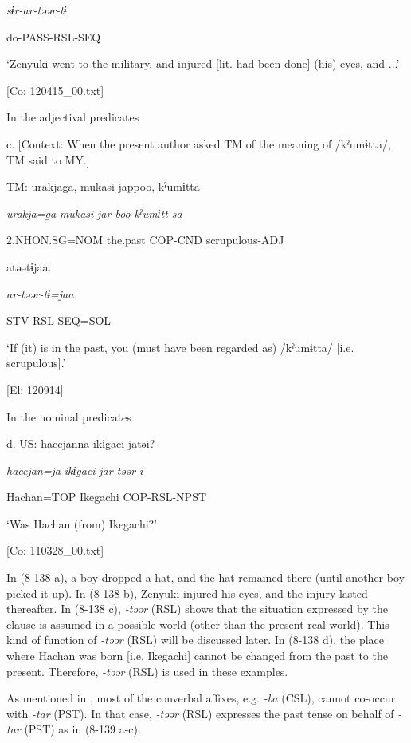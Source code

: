       \textit{sɨr-ar-təər{}-tɨ}       

      do-PASS-RSL-SEQ        

      ‘Zenyuki went to the military, and injured [lit. had been done] (his) eyes, and ...’

      [Co: 120415\_00.txt]

  In the adjectival predicates

  c.  [Context: When the present author asked TM of the meaning of /kˀumɨtta/, TM said to MY.]

    TM:  urakjaga,  mukasi  jappoo,  kˀumɨtta

      \textit{urakja=ga}  \textit{mukasi}  \textit{jar-boo}  \textit{kˀumɨtt-sa}

      2.NHON.SG=NOM  the.past  COP-CND  scrupulous-ADJ

      atəətɨjaa.

      \textit{ar-təər-tɨ=jaa}

      STV-RSL-SEQ=SOL

      ‘If (it) is in the past, you (must have been regarded as) /kˀumɨtta/ [i.e. scrupulous].’

      [El: 120914]

  In the nominal predicates

  d.  US:  haccjanna  ikɨgaci  jatəi?

      \textit{haccjan=ja}  \textit{ikɨgaci}  \textit{jar-təər{}-i}

      Hachan=TOP  Ikegachi  COP-RSL-NPST

      ‘Was Hachan (from) Ikegachi?’

      [Co: 110328\_00.txt]

In (8-138 a), a boy dropped a hat, and the hat remained there (until another boy picked it up). In (8-138 b), Zenyuki injured his eyes, and the injury lasted thereafter. In (8-138 c), \textit{{}-təər} (RSL) shows that the situation expressed by the clause is assumed in a possible world (other than the present real world). This kind of function of \textit{{}-təər} (RSL) will be discussed later. In (8-138 d), the place where Hachan was born [i.e. Ikegachi] cannot be changed from the past to the present. Therefore, \textit{-təər} (RSL) is used in these examples.

  As mentioned in , most of the converbal affixes, e.g. \textit{{}-ba} (CSL), cannot co-occur with \textit{{}-tar} (PST). In that case, \textit{{}-təər} (RSL) expresses the past tense on behalf of \textit{{}-tar} (PST) as in (8-139 a-c).

